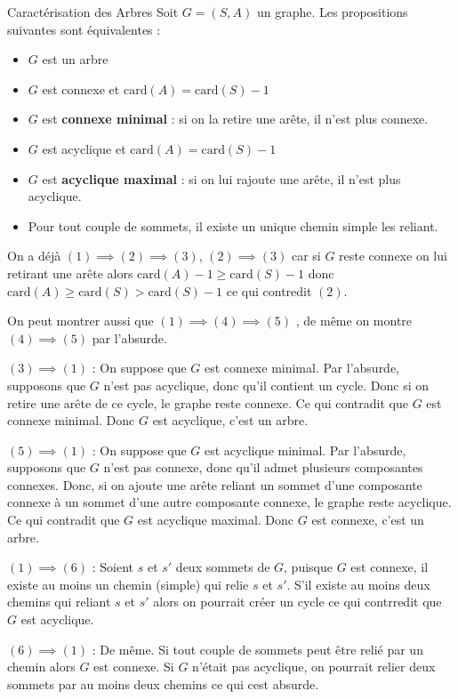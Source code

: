 \begin{Theorem}{Caractérisation des Arbres}{}
Soit $G=(S,A)$ un graphe. Les propositions suivantes sont équivalentes : 
\begin{itemize}
  \item $G$ est un arbre 
  \item $G$ est connexe et $\mathrm{card}(A) = \mathrm{card}(S)-1$ 
  \item $G$ est \textbf{connexe minimal}  : si on la retire une arête, il n'est plus connexe. 
  \item $G$ est acyclique et $\mathrm{card}(A) = \mathrm{card}  (S)-1$    
  \item $G$ est \textbf{acyclique maximal} : si on lui rajoute une arête, il n'est plus acyclique. 
  \item Pour tout couple de sommets, il existe un unique chemin simple les reliant.
\end{itemize}
\end{Theorem}

\begin{myproof}
  On a déjà $(1) \implies (2) \implies (3)$, $(2) \implies (3)$ car si $G$ reste connexe on lui retirant une arête alors $\mathrm{card} (A) - 1 \ge \mathrm{card} (S) - 1$ donc $\mathrm{card} (A) \ge \mathrm{card} (S) > \mathrm{card}(S) - 1$ ce qui contredit $(2)$. 

  On peut montrer aussi que $(1) \implies (4) \implies(5)$  , de même on montre $(4) \implies(5)$ par l'absurde. 

$(3) \implies(1)$ : On suppose que $G$ est connexe minimal. Par l'absurde, supposons que $G$ n'est pas acyclique, donc qu'il contient un cycle. Donc si on retire une arête de ce cycle, le graphe reste connexe. Ce qui contradit que $G$ est connexe minimal. Donc $G$ est acyclique, c'est un arbre.

$(5) \implies (1)$ : On suppose que $G$ est acyclique minimal. Par l'absurde, supposons que $G$ n'est pas connexe, donc qu'il admet plusieurs composantes connexes. Donc, si on ajoute une arête reliant un sommet d'une composante connexe à un sommet d'une autre composante connexe, le graphe reste acyclique. Ce qui contradit que $G$ est acyclique maximal. Donc $G$ est connexe, c'est un arbre.

$(1) \implies (6)$ : Soient $s$ et $s'$ deux sommets de $G$, puisque $G$ est connexe, il existe au moins un chemin (simple) qui relie $s$ et $s'$. S'il existe au moins deux chemins qui reliant $s$ et $s'$ alors on pourrait créer un cycle ce qui contrredit que $G$ est acyclique.

$(6) \implies (1)$ : De même. Si tout couple de sommets peut être relié par un chemin alors $G$ est connexe. Si $G$ n'était pas acyclique, on pourrait relier deux sommets par au moins deux chemins ce qui cest absurde.  
\end{myproof}

